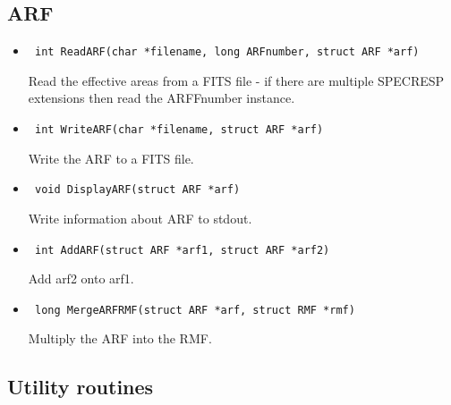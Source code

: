 \documentclass[11pt]{book}
\begin{document}
\subsection{ARF}

\begin{itemize}

\item      \begin{verbatim} int ReadARF(char *filename, long ARFnumber, struct ARF *arf)\end{verbatim}

               Read the effective areas from a FITS file - if there
               are multiple SPECRESP extensions then read the ARFFnumber instance.

\item      \begin{verbatim} int WriteARF(char *filename, struct ARF *arf)\end{verbatim}

               Write the ARF to a FITS file.

\item      \begin{verbatim} void DisplayARF(struct ARF *arf)\end{verbatim}

               Write information about ARF to stdout.

\item      \begin{verbatim} int AddARF(struct ARF *arf1, struct ARF *arf2)\end{verbatim}

               Add arf2 onto arf1.

\item      \begin{verbatim} long MergeARFRMF(struct ARF *arf, struct RMF *rmf)\end{verbatim}

               Multiply the ARF into the RMF.

\end{itemize}

\subsection{Utility routines}
\end{document}
